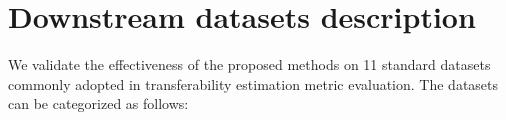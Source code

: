 




\section{Downstream datasets description}
We validate the effectiveness of the proposed methods on 11 standard datasets commonly adopted in transferability estimation metric evaluation. The datasets can be categorized as follows:

